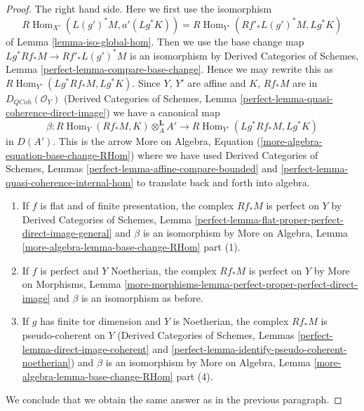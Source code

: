 \documentclass{stacks-project}
\theoremstyle{plain}
\theoremstyle{definition}
\theoremstyle{remark}
\numberwithin{equation}{subsection}
\def\Hom{\mathop{\mathrm{Hom}}\nolimits}
\def\QCoh{\mathit{QCoh}}
\begin{document}
\begin{proof}
\medskip\noindent
The right hand side. Here we first use the isomorphism
$$
R\Hom_{X'}(L(g')^*M, a'(Lg^*K)) = R\Hom_{Y'}(Rf'_*L(g')^*M, Lg^*K)
$$
of Lemma \ref{lemma-iso-global-hom}. Then we use the base change
map $Lg^*Rf_*M \to Rf'_*L(g')^*M$ is an isomorphism by
Derived Categories of Schemes, Lemma \ref{perfect-lemma-compare-base-change}.
Hence we may rewrite this as $R\Hom_{Y'}(Lg^*Rf_*M, Lg^*K)$.
Since $Y$, $Y'$ are affine and $K$, $Rf_*M$ are in $D_\QCoh(\mathcal{O}_Y)$
(Derived Categories of Schemes, Lemma
\ref{perfect-lemma-quasi-coherence-direct-image})
we have a canonical map
$$
\beta :
R\Hom_Y(Rf_*M, K) \otimes^\mathbf{L}_A A'
\longrightarrow
R\Hom_{Y'}(Lg^*Rf_*M, Lg^*K)
$$
in $D(A')$. This is the arrow
More on Algebra, Equation (\ref{more-algebra-equation-base-change-RHom})
where we have used Derived Categories of Schemes, Lemmas
\ref{perfect-lemma-affine-compare-bounded} and
\ref{perfect-lemma-quasi-coherence-internal-hom}
to translate back and forth into algebra.
\begin{enumerate}
\item If $f$ is flat and of finite presentation, the complex $Rf_*M$
is perfect on $Y$ by Derived Categories of Schemes, Lemma
\ref{perfect-lemma-flat-proper-perfect-direct-image-general}
and $\beta$ is an isomorphism by
More on Algebra, Lemma \ref{more-algebra-lemma-base-change-RHom} part (1).
\item If $f$ is perfect and $Y$ Noetherian, the complex $Rf_*M$
is perfect on $Y$ by More on Morphisms, Lemma
\ref{more-morphisms-lemma-perfect-proper-perfect-direct-image}
and $\beta$ is an isomorphism as before.
\item If $g$ has finite tor dimension and $Y$ is Noetherian,
the complex $Rf_*M$ is pseudo-coherent on $Y$
(Derived Categories of Schemes, Lemmas
\ref{perfect-lemma-direct-image-coherent} and
\ref{perfect-lemma-identify-pseudo-coherent-noetherian})
and $\beta$ is an isomorphism by
More on Algebra, Lemma \ref{more-algebra-lemma-base-change-RHom} part (4).
\end{enumerate}
We conclude that we obtain the same answer as in the previous paragraph.


\end{proof}
\end{document}
